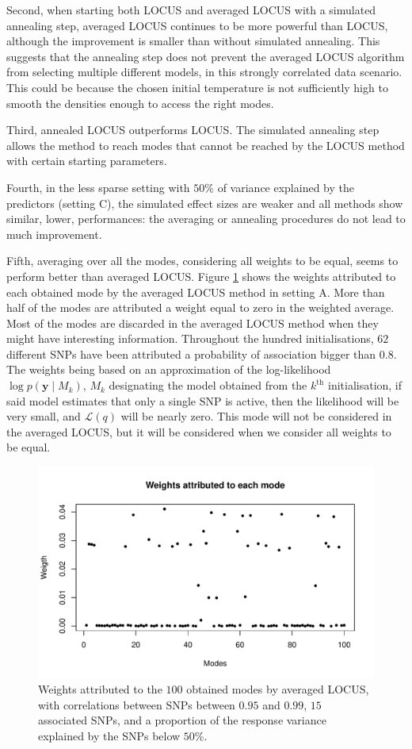 \documentclass[a4paper, 11pt]{report}
\numberwithin{equation}{chapter}
\begin{document}
Second, when starting both LOCUS and averaged LOCUS with a simulated annealing step, averaged LOCUS continues to be more powerful than LOCUS, although the improvement is smaller than without simulated annealing. This suggests that the annealing step does not prevent the averaged LOCUS algorithm from selecting multiple different models, in this strongly correlated data scenario. This could be because the chosen initial temperature is not sufficiently high to smooth the densities enough to access the right modes.

Third, annealed LOCUS outperforms LOCUS. The simulated annealing step allows the method to reach modes that cannot be reached by the LOCUS method with certain starting parameters. 

Fourth, in the less sparse setting with $50\%$ of variance explained by the predictors (setting C), the simulated effect sizes are weaker and all methods show similar, lower, performances: the averaging or annealing procedures do not lead to much improvement.

Fifth, averaging over all the modes, considering all weights to be equal, seems to perform better than averaged LOCUS. Figure \ref{fig:weightsModes} shows the weights attributed to each obtained mode by the averaged LOCUS method in setting A. More than half of the modes are attributed a weight equal to zero in the weighted average. Most of the modes are discarded in the averaged LOCUS method when they might have interesting information. Throughout the hundred initialisations, $62$ different SNPs have been attributed a probability of association bigger than $0.8$. The weights being based on an approximation of the log-likelihood $\log p(\boldsymbol{y}\mid M_k)$, $M_k$ designating the model obtained from the $k^{\mathrm{th}}$ initialisation, if said model estimates that only a single SNP is active, then the likelihood will be very small, and $\mathcal{L}(q)$ will be nearly zero. This mode will not be considered in the averaged LOCUS, but it will be considered when we consider all weights to be equal.

\begin{figure}[h!]
\centering
\includegraphics[width=5in]{images/WeightsMode.pdf}
\caption{\label{fig:weightsModes}Weights attributed to the $100$ obtained modes by averaged LOCUS, with correlations between SNPs between $0.95$ and $0.99$, $15$ associated SNPs, and a proportion of the response variance explained by the SNPs below $50\%$.}
\end{figure}
\end{document}
